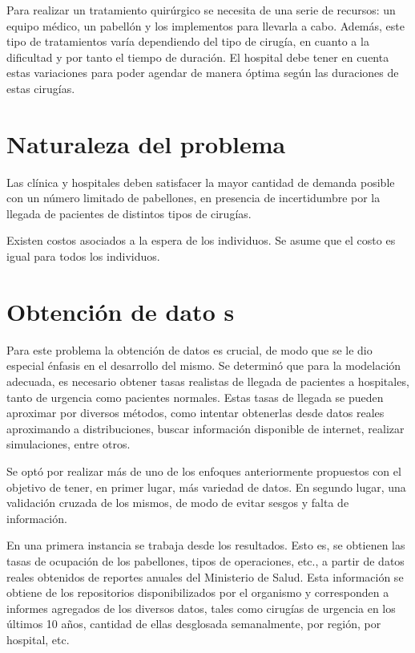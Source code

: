 \documentclass[letterpaper,10pt]{article}
\begin{document}
Para realizar un tratamiento quirúrgico se necesita de una serie de recursos: un equipo médico, un pabellón y los implementos para llevarla a cabo. Además, este tipo de tratamientos varía dependiendo del tipo de cirugía, en cuanto a la dificultad y por tanto el tiempo de duración. El hospital debe tener en cuenta estas variaciones para poder agendar de manera óptima según las duraciones de estas cirugías.

\section*{Naturaleza del problema}
Las clínica y hospitales deben satisfacer la mayor cantidad de demanda posible con un número limitado de pabellones, en presencia de incertidumbre por la llegada de pacientes de distintos tipos de cirugías.

Existen costos asociados a la espera de los individuos. Se asume que el costo es igual para todos los individuos.

\section*{Obtención de dato s}

Para este problema la obtención de datos es crucial, de modo que se le dio especial énfasis en el desarrollo del mismo. Se determinó que para la modelación adecuada, es necesario obtener tasas realistas de llegada de pacientes a hospitales, tanto de urgencia como pacientes normales. Estas tasas de llegada se pueden aproximar por diversos métodos, como intentar obtenerlas desde datos reales aproximando a distribuciones, buscar información disponible de internet, realizar simulaciones, entre otros.

Se optó por realizar más de uno de los enfoques anteriormente propuestos con el objetivo de tener, en primer lugar, más variedad de datos. En segundo lugar, una validación cruzada de los mismos, de modo de evitar sesgos y falta de información.

En una primera instancia se trabaja desde los resultados. Esto es, se obtienen las tasas de ocupación de los pabellones, tipos de operaciones, etc., a partir de datos reales obtenidos de reportes anuales del Ministerio de Salud. Esta información se obtiene de los repositorios disponibilizados por el organismo \cite{minsal} y corresponden a informes agregados de los diversos datos, tales como cirugías de urgencia en los últimos 10 años, cantidad de ellas desglosada semanalmente, por región, por hospital, etc.
\end{document}

